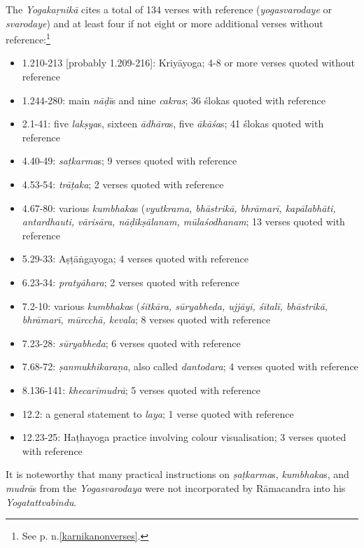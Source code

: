 The \emph{Yogakaṛnikā} cites a total of 134 verses with reference (\textit{yogasvarodaye} or \textit{svarodaye}) and at least four if not eight or more additional verses without reference:\footnote{See p.\pageref{karnikanonverses} n.\ref{karnikanonverses}.}  
\begin{itemize}
  \item 1.210-213 [probably 1.209-216]: Kriyāyoga; 4-8 or more verses quoted without reference
  \item 1.244-280: main \textit{nāḍī}s and nine \textit{cakras}; 36 ślokas quoted with reference 
  \item 2.1-41: five \textit{lakṣya}s, sixteen \textit{ādhāra}s, five \textit{ākāśa}s; 41 ślokas quoted with reference 
  \item 4.40-49: \textit{saṭkarma}s; 9 verses quoted with reference 
  \item 4.53-54: \textit{trāṭaka}; 2 verses quoted with reference  
  \item 4.67-80: various \textit{kumbhaka}s (\textit{vyutkrama, bhāstrikā, bhrāmarī, kapālabhāti, antardhauti, vārisāra, nāḍikṣālanam, mūlaśodhanam}; 13 verses quoted with reference
  \item 5.29-33: Aṣṭāṅgayoga; 4 verses quoted with reference 
  \item 6.23-34: \textit{pratyāhara}; 2 verses quoted with reference
  \item 7.2-10: various \textit{kumbhaka}s (\textit{śītkāra, sūryabheda, ujjāyī, śītalī, bhāstrikā, bhrāmarī, mūrcchā, kevala}; 8 verses quoted with reference 
  \item 7.23-28: \textit{sūryabheda}; 6 verses quoted with reference
  \item 7.68-72: \textit{ṣanmukhikaraṇa}, also called \textit{dantodara}; 4 verses quoted with reference 
  \item 8.136-141: \textit{khecarīmudrā}; 5 verses quoted with reference
  \item 12.2: a general statement to \textit{laya}; 1 verse quoted with reference 
  \item 12.23-25: Haṭhayoga practice involving colour visualisation; 3 verses quoted with reference
  \end{itemize}
  
  It is noteworthy that many practical instructions on \textit{ṣaṭkarma}s, \textit{kumbhaka}s, and \textit{mudrā}s from the \emph{Yogasvarodaya} were not incorporated by Rāmacandra into his \emph{Yogatattvabindu}.

